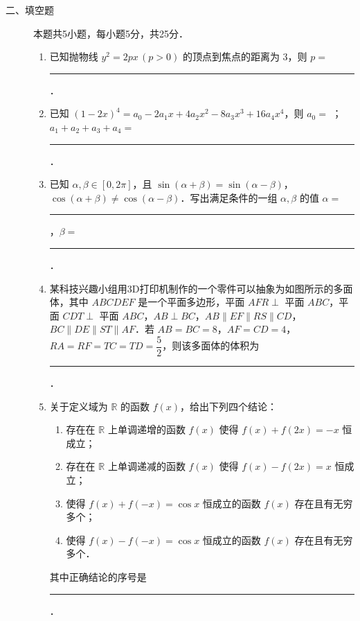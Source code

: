 \begin{description}
    \item[二、填空题] 本题共5小题，每小题5分，共25分．
    \begin{enumerate}[leftmargin=5pt]
      \addtocounter{enumi}{+10}
        \item 已知抛物线 $y^2=2px\,(p>0)$ 的顶点到焦点的距离为 $3$，则 $p=$ \rule[-0.3ex]{3em}{0.4pt}．
        \item 已知 $(1-2x)^4=a_0-2a_1x+4a_2x^2-8a_3x^3+16a_4x^4$，则 $a_0=$ \uline{\hspace{4em}}；$a_1+a_2+a_3+a_4=$ \rule[-0.3ex]{3em}{0.4pt}．
        \item 已知 $\alpha,\beta\in[0,2\pi]$，且 $\sin(\alpha+\beta)=\sin(\alpha-\beta)$，$\cos(\alpha+\beta)\neq\cos(\alpha-\beta)$．写出满足条件的一组 $\alpha,\beta$ 的值 $\alpha=$ \rule[-0.3ex]{3em}{0.4pt}，$\beta=$ \rule[-0.3ex]{3em}{0.4pt}．
        \item 某科技兴趣小组用3D打印机制作的一个零件可以抽象为如图所示的多面体，其中 $ABCDEF$ 是一个平面多边形，平面 $AFR\perp$ 平面 $ABC$，平面 $CDT\perp$ 平面 $ABC$，$AB\perp BC$，$AB\parallel EF\parallel RS\parallel CD$，$BC\parallel DE\parallel ST\parallel AF$．若 $AB=BC=8$，$AF=CD=4$，$RA=RF=TC=TD=\dfrac{5}{2}$，则该多面体的体积为 \rule[-0.3ex]{3em}{0.4pt}．
        \item 关于定义域为 $\mathbb{R}$ 的函数 $f(x)$，给出下列四个结论：
        \begin{enumerate}[label=\textcircled{\arabic*}]
            \item 存在在 $\mathbb{R}$ 上单调递增的函数 $f(x)$ 使得 $f(x)+f(2x)=-x$ 恒成立；
            \item 存在在 $\mathbb{R}$ 上单调递减的函数 $f(x)$ 使得 $f(x)-f(2x)=x$ 恒成立；
            \item 使得 $f(x)+f(-x)=\cos x$ 恒成立的函数 $f(x)$ 存在且有无穷多个；
            \item 使得 $f(x)-f(-x)=\cos x$ 恒成立的函数 $f(x)$ 存在且有无穷多个．
        \end{enumerate}
        其中正确结论的序号是 \rule[-0.3ex]{3em}{0.4pt}．
    \end{enumerate}
\end{description}

